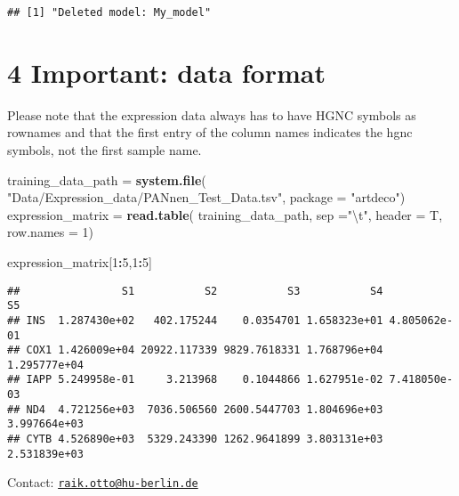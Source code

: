 \documentclass[]{article}
\newenvironment{Shaded}{\begin{snugshade}}{\end{snugshade}}
\newcommand{\KeywordTok}[1]{\textcolor[rgb]{0.13,0.29,0.53}{\textbf{#1}}}
\newcommand{\DataTypeTok}[1]{\textcolor[rgb]{0.13,0.29,0.53}{#1}}
\newcommand{\DecValTok}[1]{\textcolor[rgb]{0.00,0.00,0.81}{#1}}
\newcommand{\CharTok}[1]{\textcolor[rgb]{0.31,0.60,0.02}{#1}}
\newcommand{\StringTok}[1]{\textcolor[rgb]{0.31,0.60,0.02}{#1}}
\newcommand{\OperatorTok}[1]{\textcolor[rgb]{0.81,0.36,0.00}{\textbf{#1}}}
\newcommand{\NormalTok}[1]{#1}
\begin{document}
\begin{verbatim}
## [1] "Deleted model: My_model"
\end{verbatim}

\section{4 Important: data format}\label{important-data-format}

Please note that the expression data always has to have HGNC symbols as
rownames and that the first entry of the column names indicates the hgnc
symbols, not the first sample name.

\begin{Shaded}
\begin{Highlighting}[]
\NormalTok{training_data_path =}\StringTok{ }\KeywordTok{system.file}\NormalTok{(}
    \StringTok{"Data/Expression_data/PANnen_Test_Data.tsv"}\NormalTok{, }\DataTypeTok{package =} \StringTok{"artdeco"}\NormalTok{)}
\NormalTok{expression_matrix =}\StringTok{ }\KeywordTok{read.table}\NormalTok{(}
\NormalTok{    training_data_path,}
    \DataTypeTok{sep =}\StringTok{"}\CharTok{\textbackslash{}t}\StringTok{"}\NormalTok{,}
    \DataTypeTok{header =}\NormalTok{ T,}
    \DataTypeTok{row.names =} \DecValTok{1}\NormalTok{)}

\NormalTok{expression_matrix[}\DecValTok{1}\OperatorTok{:}\DecValTok{5}\NormalTok{,}\DecValTok{1}\OperatorTok{:}\DecValTok{5}\NormalTok{]}
\end{Highlighting}
\end{Shaded}

\begin{verbatim}
##                S1           S2           S3           S4           S5
## INS  1.287430e+02   402.175244    0.0354701 1.658323e+01 4.805062e-01
## COX1 1.426009e+04 20922.117339 9829.7618331 1.768796e+04 1.295777e+04
## IAPP 5.249958e-01     3.213968    0.1044866 1.627951e-02 7.418050e-03
## ND4  4.721256e+03  7036.506560 2600.5447703 1.804696e+03 3.997664e+03
## CYTB 4.526890e+03  5329.243390 1262.9641899 3.803131e+03 2.531839e+03
\end{verbatim}

Contact:
\href{mailto:raik.otto@hu-berlin.de}{\nolinkurl{raik.otto@hu-berlin.de}}
\end{document}
